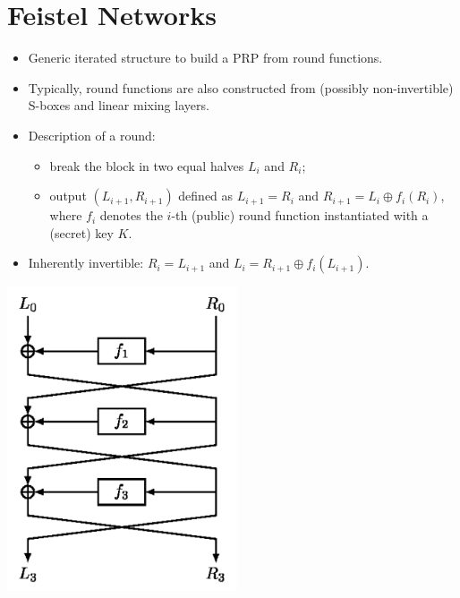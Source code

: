 \section{Feistel Networks}
	\begin{itemize}
	    \item Generic iterated structure to build a PRP from round functions.
	    \item Typically, round functions are also constructed from (possibly non-invertible) S-boxes and linear mixing layers.
	    \item Description of a round:
	    \begin{itemize}
	        \item break the block in two equal halves $L_i$ and $R_i$;
	        \item output $(L_{i+1},R_{i+1})$ defined as $L_{i+1} = R_i$ and $R_{i+1} = L_i \oplus f_i(R_i)$, where $f_i$ denotes 
	        the $i$-th (public) round function instantiated with a (secret) key $K$.
	    \end{itemize}
	    \item Inherently invertible: $R_i = L_{i+1}$ and $L_i = R_{i+1} \oplus f_i(L_{i+1})$.
	\end{itemize}
    \begin{center}
		\includegraphics[width=68mm]{Graphics/Block Ciphers/bc2.png}
	\end{center}


